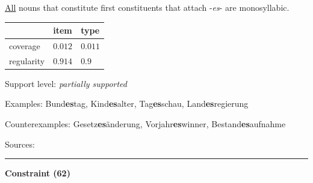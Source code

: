 \noindent
\underline{All} nouns that constitute first constituents that attach -\textit{es}- are monosyllabic.
\vspace{0.35em}


\vspace{-0.35em}

\begin{table}[!ht]
\begin{center}

\begin{tabularx}{\columnwidth}{|X|X|X|}
\hline
 & item & type \\
\hline
 coverage & $0.012$ & $0.011$ \\
\hline
 regularity & $0.914$ & $0.9$ \\
\hline
\end{tabularx}
\end{center}
\end{table}

\vspace{-1.35em}

\noindent
Support level: \textit{partially supported}

\vspace{0.3em}

\noindent
Examples: Bund\textbf{es}tag, Kind\textbf{es}alter, Tag\textbf{es}schau, Land\textbf{es}regierung

\noindent
Counterexamples: Gesetz\textbf{es}änderung, Vorjahr\textbf{es}winner, Bestand\textbf{es}aufnahme

\vspace{0.3em}

\noindent
Sources: \citet[11, 18]{kuerschner_2010}


\hrule




\vspace{0.4em}

\begin{center}
\textbf{Constraint (62)}
\end{center}

